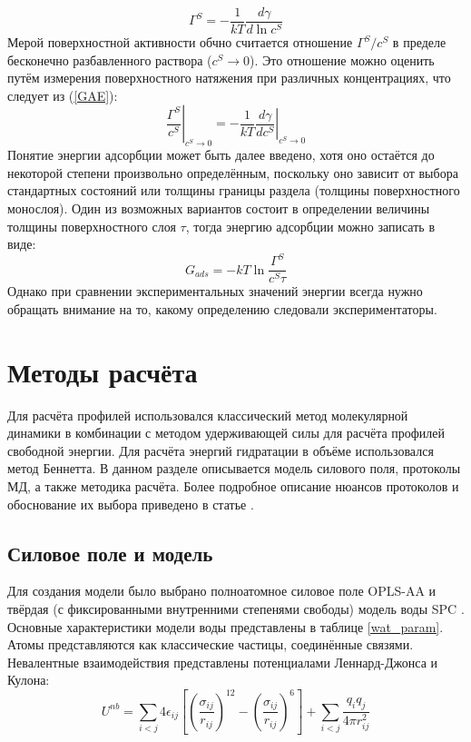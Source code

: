 \begin{equation}
\Gamma^S=-\frac{1}{kT}\frac{d\gamma}{d\ln{c^S}}
\label{GAE}
\end{equation}
Мерой поверхностной активности обчно считается отношение $\Gamma^S/c^S$ в пределе бесконечно разбавленного раствора ($c^S\rightarrow 0$).
Это отношение можно оценить путём измерения поверхностного натяжения при различных концентрациях, что следует из (\ref{GAE}):
\begin{equation}
\left. \frac{\Gamma^S}{c^S}  \right|_{c^S\rightarrow 0}=-\frac{1}{kT}\left. \frac{d\gamma}{dc^S} \right|_{c^S\rightarrow 0}
\label{exp_GE_conc_ratio}
\end{equation}
Понятие энергии адсорбции может быть далее введено, хотя оно остаётся до некоторой степени произвольно определённым, поскольку оно зависит от выбора стандартных состояний или толщины границы раздела (толщины поверхностного монослоя). Один из возможных вариантов состоит в определении величины толщины поверхностного слоя $\tau$, тогда энергию адсорбции можно записать в виде:
\begin{equation}
G_{ads}=-kT\ln{\frac{\Gamma^S}{c^S\tau}}
\label{ads_fe_eq}
\end{equation}
Однако при сравнении экспериментальных значений энергии всегда нужно обращать внимание на то, какому определению следовали экспериментаторы.




\section{Методы расчёта}
Для расчёта профилей использовался классический метод молекулярной динамики в комбинации с методом удерживающей силы для расчёта профилей свободной энергии. Для расчёта энергий гидратации в объёме использовался метод Беннетта. В данном разделе описывается модель силового поля, протоколы МД, а также методика расчёта. Более подробное описание нюансов протоколов и обоснование их выбора приведено в статье \cite{shaytan_free_2010}.

\subsection{\label{sec:forcefield}Силовое поле и модель}
Для создания модели было выбрано полноатомное силовое поле  OPLS-AA \cite{opls-aa}
и твёрдая (с фиксированными внутренними степенями свободы) модель воды SPC \cite{spc}. Основные характеристики модели воды представлены в таблице \ref{wat_param}. 
Атомы представляются как классические частицы, соединённые связями. Невалентные взаимодействия представлены потенциалами Леннард-Джонса и Кулона:
\begin{equation}
U^{nb}=\sum_{i<j}4\epsilon_{ij}\left[\left(\frac{\sigma_{ij}}{r_{ij}}\right)^{12}-\left(\frac{\sigma_{ij}}{r_{ij}}\right)^{6}\right]+\sum_{i<j}\frac{q_iq_j}{4\pi r_{ij}^2}
\label{non-bond}
\end{equation}


